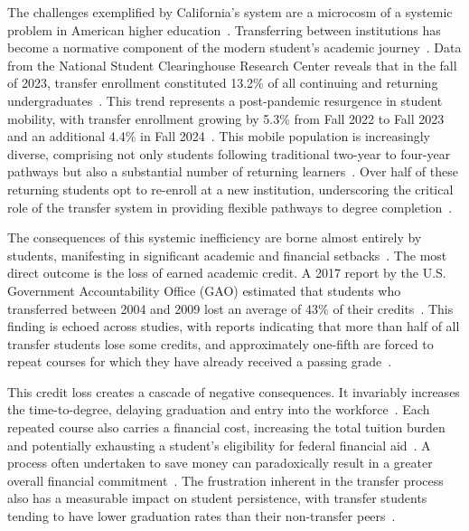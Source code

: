 The challenges exemplified by California's system are a microcosm of a systemic problem in American higher education~\cite{collegeopportunity2017}. Transferring between institutions has become a normative component of the modern student's academic journey~\cite{publicagenda2025}. Data from the National Student Clearinghouse Research Center reveals that in the fall of 2023, transfer enrollment constituted 13.2\% of all continuing and returning undergraduates~\cite{nscnews2023}. This trend represents a post-pandemic resurgence in student mobility, with transfer enrollment growing by 5.3\% from Fall 2022 to Fall 2023 and an additional 4.4\% in Fall 2024~\cite{nscnews2023,nscnews20250305}. This mobile population is increasingly diverse, comprising not only students following traditional two-year to four-year pathways but also a substantial number of returning learners~\cite{nscdd20250507}. Over half of these returning students opt to re-enroll at a new institution, underscoring the critical role of the transfer system in providing flexible pathways to degree completion~\cite{nscdd20250507}.

The consequences of this systemic inefficiency are borne almost entirely by students, manifesting in significant academic and financial setbacks~\cite{gao2017}. The most direct outcome is the loss of earned academic credit. A 2017 report by the U.S. Government Accountability Office (GAO) estimated that students who transferred between 2004 and 2009 lost an average of 43\% of their credits~\cite{gao2017}. This finding is echoed across studies, with reports indicating that more than half of all transfer students lose some credits, and approximately one-fifth are forced to repeat courses for which they have already received a passing grade~\cite{publicagenda2025}.

This credit loss creates a cascade of negative consequences. It invariably increases the time-to-degree, delaying graduation and entry into the workforce~\cite{gao2017}. Each repeated course also carries a financial cost, increasing the total tuition burden and potentially exhausting a student's eligibility for federal financial aid~\cite{gao2017}. A process often undertaken to save money can paradoxically result in a greater overall financial commitment~\cite{collegeopportunity2017}. The frustration inherent in the transfer process also has a measurable impact on student persistence, with transfer students tending to have lower graduation rates than their non-transfer peers~\cite{porter1999}.

